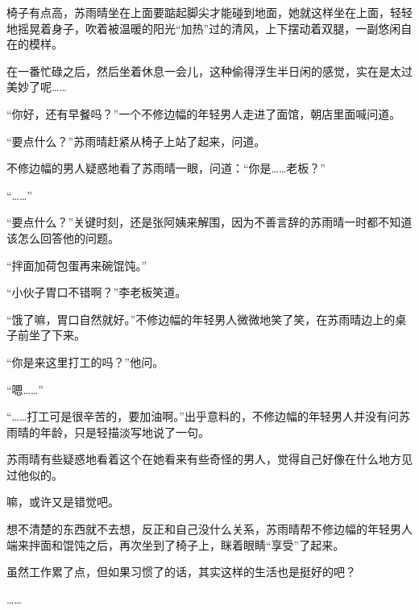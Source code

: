 椅子有点高，苏雨晴坐在上面要踮起脚尖才能碰到地面，她就这样坐在上面，轻轻地摇晃着身子，吹着被温暖的阳光“加热”过的清风，上下摆动着双腿，一副悠闲自在的模样。

在一番忙碌之后，然后坐着休息一会儿，这种偷得浮生半日闲的感觉，实在是太过美妙了呢……

“你好，还有早餐吗？”一个不修边幅的年轻男人走进了面馆，朝店里面喊问道。

“要点什么？”苏雨晴赶紧从椅子上站了起来，问道。

不修边幅的男人疑惑地看了苏雨晴一眼，问道：“你是……老板？”

“……”

“要点什么？”关键时刻，还是张阿姨来解围，因为不善言辞的苏雨晴一时都不知道该怎么回答他的问题。

“拌面加荷包蛋再来碗馄饨。”

“小伙子胃口不错啊？”李老板笑道。

“饿了嘛，胃口自然就好。”不修边幅的年轻男人微微地笑了笑，在苏雨晴边上的桌子前坐了下来。

“你是来这里打工的吗？”他问。

“嗯……”

“……打工可是很辛苦的，要加油啊。”出乎意料的，不修边幅的年轻男人并没有问苏雨晴的年龄，只是轻描淡写地说了一句。

苏雨晴有些疑惑地看着这个在她看来有些奇怪的男人，觉得自己好像在什么地方见过他似的。

嘛，或许又是错觉吧。

想不清楚的东西就不去想，反正和自己没什么关系，苏雨晴帮不修边幅的年轻男人端来拌面和馄饨之后，再次坐到了椅子上，眯着眼睛“享受”了起来。

虽然工作累了点，但如果习惯了的话，其实这样的生活也是挺好的吧？

……
